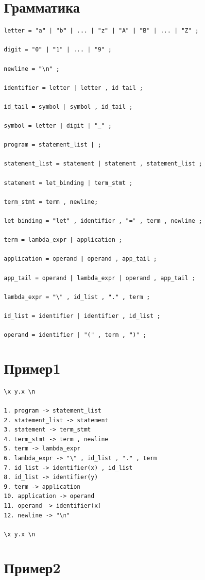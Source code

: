 \documentclass[12pt,a4paper]{article}
\begin{document}
\section{Грамматика}

\begin{verbatim}
letter = "a" | "b" | ... | "z" | "A" | "B" | ... | "Z" ;

digit = "0" | "1" | ... | "9" ;

newline = "\n" ;

identifier = letter | letter , id_tail ;

id_tail = symbol | symbol , id_tail ;

symbol = letter | digit | "_" ;

program = statement_list | ;

statement_list = statement | statement , statement_list ;

statement = let_binding | term_stmt ;

term_stmt = term , newline;

let_binding = "let" , identifier , "=" , term , newline ;

term = lambda_expr | application ;

application = operand | operand , app_tail ;

app_tail = operand | lambda_expr | operand , app_tail ;

lambda_expr = "\" , id_list , "." , term ;

id_list = identifier | identifier , id_list ;

operand = identifier | "(" , term , ")" ;
\end{verbatim}

\section{Пример1}

\begin{verbatim}
\x y.x \n

1. program -> statement_list
2. statement_list -> statement
3. statement -> term_stmt
4. term_stmt -> term , newline
5. term -> lambda_expr
6. lambda_expr -> "\" , id_list , "." , term
7. id_list -> identifier(x) , id_list
8. id_list -> identifier(y)
9. term -> application
10. application -> operand
11. operand -> identifier(x)
12. newline -> "\n"

\x y.x \n
\end{verbatim}

\section{Пример2}
\end{document}
